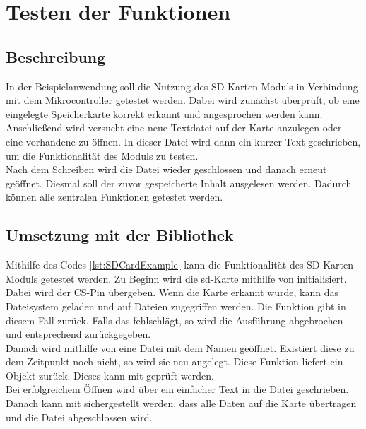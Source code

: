 \section{Testen der Funktionen}
\subsection{Beschreibung}

In der Beispielanwendung soll die Nutzung des SD-Karten-Moduls in Verbindung mit dem Mikrocontroller getestet werden. Dabei wird zunächst überprüft, ob eine eingelegte Speicherkarte korrekt erkannt und angesprochen werden kann. Anschließend wird versucht eine neue Textdatei auf der Karte anzulegen oder eine vorhandene zu öffnen. In dieser Datei wird dann ein kurzer Text geschrieben, um die Funktionalität des Moduls zu testen. 
\\
Nach dem Schreiben wird die Datei wieder geschlossen und danach erneut geöffnet. Diesmal soll der zuvor gespeicherte Inhalt ausgelesen werden. Dadurch können alle zentralen Funktionen getestet werden.

\subsection{Umsetzung mit der  Bibliothek}

Mithilfe des Codes \ref{lst:SDCardExample} kann die Funktionalität des SD-Karten-Moduls getestet werden. Zu Beginn wird die \acs{sd}-Karte mithilfe von  initialisiert. Dabei wird der CS-Pin übergeben. Wenn die Karte erkannt wurde, kann das Dateisystem geladen und auf Dateien zugegriffen werden. Die Funktion gibt in diesem Fall  zurück. Falls das fehlschlägt, so wird die Ausführung abgebrochen und entsprechend  zurückgegeben.\\

Danach wird mithilfe von  eine Datei mit dem Namen  geöffnet. Existiert diese zu dem Zeitpunkt noch nicht, so wird sie neu angelegt. Diese Funktion liefert ein -Objekt zurück. Dieses kann mit  geprüft werden.\\

Bei erfolgreichem Öffnen wird über  ein einfacher Text in die Datei geschrieben. Danach kann mit  sichergestellt werden, dass alle Daten auf die Karte übertragen und die Datei abgeschlossen wird.\\

